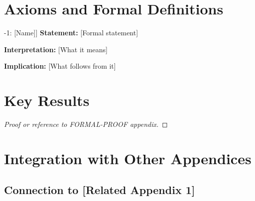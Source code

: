 \section{Axioms and Formal Definitions}
\label{sec:[code]-axioms}


\begin{tcolorbox}[colback=gray!5!white, colframe=gray!75!black, 
    title=Axiom [CODE]-1: [Name]]
\textbf{Statement:} [Formal statement]

\textbf{Interpretation:} [What it means]

\textbf{Implication:} [What follows from it]
\end{tcolorbox}



\section{Key Results}
\label{sec:[code]-results}


\begin{proposition}
\end{proposition}

\begin{proof}
[Proof or reference to FORMAL-PROOF appendix]
\end{proof}


\section{Integration with Other Appendices}
\label{sec:[code]-integration}


\subsection{Connection to [Related Appendix 1]}

